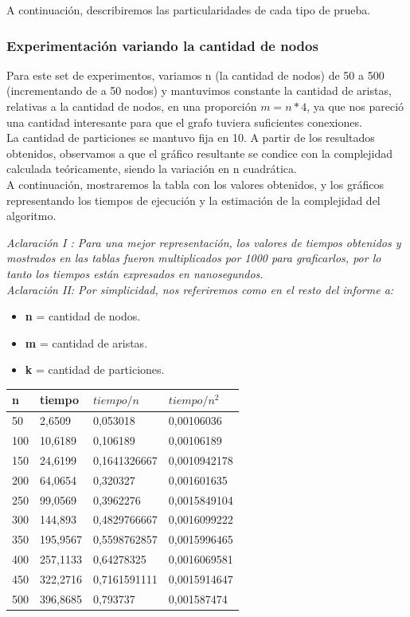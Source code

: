 \documentclass[10pt,a4paper]{article}
\begin{document}
\noindent A continuación, describiremos las particularidades de cada tipo de prueba.

\subsubsection{Experimentación variando la cantidad de nodos}

Para este set de experimentos, variamos n (la cantidad de nodos) de 50 a 500 (incrementando de a 50 nodos) y mantuvimos constante la cantidad de aristas, relativas a la cantidad de nodos, en una proporción $m = n*4$, ya que nos pareció una cantidad interesante para que el grafo tuviera suficientes conexiones.\\ La cantidad de particiones se mantuvo fija en 10.
A partir de los resultados obtenidos, observamos a que el gráfico resultante se condice con la complejidad calculada teóricamente, siendo la variación en n cuadrática.\\
A continuación, mostraremos la tabla con los valores obtenidos, y los gráficos representando los tiempos de ejecución y la estimación de la complejidad del algoritmo.

\noindent \textit{Aclaración I : Para una mejor representación, los valores de tiempos obtenidos y mostrados en las tablas fueron multiplicados por 1000 para graficarlos, por lo tanto los tiempos están expresados en nanosegundos.}\\

\noindent \textit{Aclaración II: Por simplicidad, nos referiremos como en el resto del informe a:}\\

\noindent \begin{itemize}
\item \textbf{n} = cantidad de nodos.
\item \textbf{m} = cantidad de aristas.
\item \textbf{k} = cantidad de particiones.
\end{itemize}

\begin{center}
	\begin{tabular}{| l | l | l | l |}
	\hline
	n & tiempo & $tiempo/n$ & $tiempo/n^2$\\ \hline
	50 & 2,6509 & 0,053018 & 0,00106036\\
	100 & 10,6189 & 0,106189 & 0,00106189\\
	150 & 24,6199 & 0,1641326667 & 0,0010942178\\
	200	& 64,0654 & 0,320327 & 0,001601635\\
	250 & 99,0569 & 0,3962276 & 0,0015849104\\
	300 & 144,893 & 0,4829766667 & 0,0016099222\\
	350 & 195,9567 & 0,5598762857 & 0,0015996465\\
	400 & 257,1133 & 0,64278325 & 0,0016069581\\
	450 & 322,2716 & 0,7161591111 & 0,0015914647\\
	500	& 396,8685 & 0,793737 & 0,001587474\\
	\hline
	\end{tabular}
\end{center}
\end{document}
